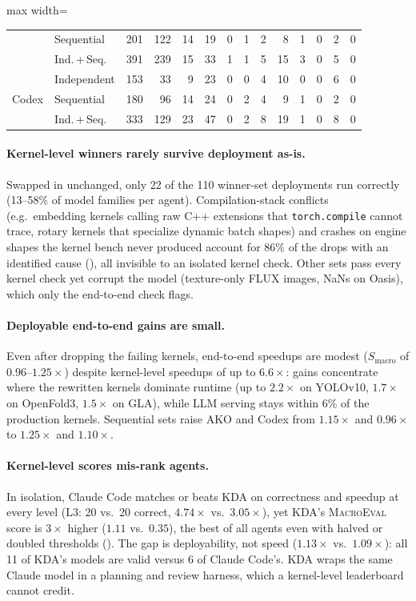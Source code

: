 \begin{table}[t]
\begin{adjustbox}{max width=\linewidth}
\begin{tabular}{@{}ll rr rrrrr rrrrr@{}}
 & Sequential & 201 & 122 & 14 & 19 & 0 & 1 & 2 & 8 & 1 & 0 & 2 & 0 \\
 & Ind.\,+\,Seq. & 391 & 239 & 15 & 33 & 1 & 1 & 5 & 15 & 3 & 0 & 5 & 0 \\
\midrule
\multirow{3}{*}{Codex} & Independent & 153 & 33 & 9 & 23 & 0 & 0 & 4 & 10 & 0 & 0 & 6 & 0 \\
 & Sequential & 180 & 96 & 14 & 24 & 0 & 2 & 4 & 9 & 1 & 0 & 2 & 0 \\
 & Ind.\,+\,Seq. & 333 & 129 & 23 & 47 & 0 & 2 & 8 & 19 & 1 & 0 & 8 & 0 \\
\bottomrule
\end{tabular}
  \end{adjustbox}
\end{table}

\paragraph{Kernel-level winners rarely survive deployment as-is.}
Swapped in unchanged, only 22 of the 110 winner-set deployments run correctly (13--58\% of model families per agent).
Compilation-stack conflicts (e.g.\ embedding kernels calling raw C++ extensions that \texttt{torch.compile} cannot trace, rotary kernels that specialize dynamic batch shapes) and crashes on engine shapes the kernel bench never produced account for 86\% of the drops with an identified cause (), all invisible to an isolated kernel check.
Other sets pass every kernel check yet corrupt the model (texture-only FLUX images, NaNs on Oasis), which only the end-to-end check flags.

\paragraph{Deployable end-to-end gains are small.}
Even after dropping the failing kernels, end-to-end speedups are modest ($S_{\mathrm{macro}}$ of $0.96$--$1.25\times$) despite kernel-level speedups of up to $6.6\times$: gains concentrate where the rewritten kernels dominate runtime (up to $2.2\times$ on YOLOv10, $1.7\times$ on OpenFold3, $1.5\times$ on GLA), while LLM serving stays within 6\% of the production kernels.
Sequential sets raise AKO and Codex from $1.15\times$ and $0.96\times$ to $1.25\times$ and $1.10\times$.

\paragraph{Kernel-level scores mis-rank agents.}
In isolation, Claude Code matches or beats KDA on correctness and speedup at every level (L3: 20 vs.\ 20 correct, $4.74\times$ vs.\ $3.05\times$), yet KDA's \textsc{MacroEval} score is $3\times$ higher ($1.11$ vs.\ $0.35$), the best of all agents even with halved or doubled thresholds ().
The gap is deployability, not speed ($1.13\times$ vs.\ $1.09\times$): all 11 of KDA's models are valid versus 6 of Claude Code's. KDA wraps the same Claude model in a planning and review harness, which a kernel-level leaderboard cannot credit.

